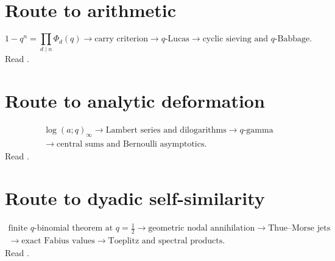\documentclass[11pt,oneside,openany]{book}
\theoremstyle{definition}
\theoremstyle{remark}
\begin{document}
\section*{Route to arithmetic}
\[
 1-q^n=\prod_{d\mid n}\Phi_d(q)
 \longrightarrow \text{carry criterion}
 \longrightarrow q\text{-Lucas}
 \longrightarrow \text{cyclic sieving and }q\text{-Babbage}.
\]
Read .

\section*{Route to analytic deformation}
\[
\begin{gathered}
 \log(a;q)_\infty
 \longrightarrow \text{Lambert series and dilogarithms}
 \longrightarrow q\text{-gamma}\\
 \longrightarrow \text{central sums and Bernoulli asymptotics}.
\end{gathered}
\]
Read .

\section*{Route to dyadic self-similarity}
\[
\begin{gathered}
 \text{finite }q\text{-binomial theorem at }q=\tfrac12
 \longrightarrow \text{geometric nodal annihilation}
 \longrightarrow \text{Thue--Morse jets}\\
 \longrightarrow \text{exact Fabius values}
 \longrightarrow \text{Toeplitz and spectral products}.
\end{gathered}
\]
Read .

\backmatter
\end{document}
